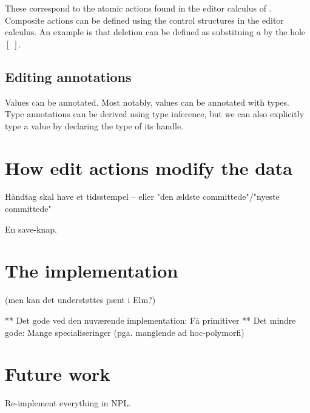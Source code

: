 \documentclass{article}
\begin{document}
These correspond to the atomic actions found in the editor calculus of 
\cite{DBLP:conf/pepm/GodiksenHHLO21}. Composite actions can be defined
using the control structures in the editor calculus. An example is
that deletion can be defined as substituing $a$ by the hole $[\;]$.

\subsection{Editing annotations}

Values can be annotated. Most notably, values can be annotated with
types. Type annotations can be derived using type inference, but we
can also explicitly type a value by declaring the type of its handle.

\section{How edit actions modify the data}


Håndtag skal have et tidsstempel – eller "den ældste committede"/"nyeste committede"

En save-knap.

\section{The implementation}

(men kan det understøttes pænt i Elm?)

** Det gode ved den nuværende implementation: Få primitiver
** Det mindre gode: Mange specialiseringer (pga. manglende ad hoc-polymorfi)


\section{Future work}

Re-implement everything in NPL.



\end{document}
